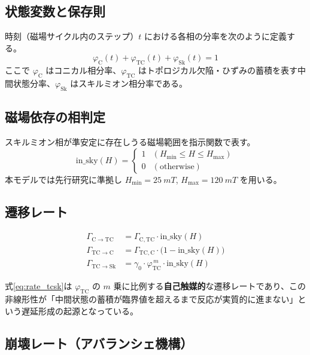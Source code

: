 \documentclass[11pt,a4paper]{ltjsarticle}
\begin{document}
\subsection{状態変数と保存則}

時刻（磁場サイクル内のステップ）$t$ における各相の分率を次のように定義する。
\begin{equation}
\varphi_\mathrm{C}(t) + \varphi_\mathrm{TC}(t) + \varphi_\mathrm{Sk}(t) = 1
\label{eq:conservation}
\end{equation}
ここで $\varphi_\mathrm{C}$ はコニカル相分率、$\varphi_\mathrm{TC}$ はトポロジカル欠陥・ひずみの蓄積を表す中間状態分率、$\varphi_\mathrm{Sk}$ はスキルミオン相分率である。

\subsection{磁場依存の相判定}

スキルミオン相が準安定に存在しうる磁場範囲を指示関数で表す。
\begin{equation}
\mathrm{in\_sky}(H) =
\begin{cases}
1 & (H_\mathrm{min} \le H \le H_\mathrm{max}) \\
0 & (\text{otherwise})
\end{cases}
\label{eq:insky}
\end{equation}
本モデルでは先行研究に準拠し $H_\mathrm{min}=\SI{25}{mT}$, $H_\mathrm{max}=\SI{120}{mT}$ を用いる。

\subsection{遷移レート}

\begin{align}
\Gamma_{\mathrm{C}\to\mathrm{TC}} &= \Gamma_{\mathrm{C,TC}} \cdot \mathrm{in\_sky}(H) \label{eq:rate_ctc}\\
\Gamma_{\mathrm{TC}\to\mathrm{C}} &= \Gamma_{\mathrm{TC,C}} \cdot \bigl(1 - \mathrm{in\_sky}(H)\bigr) \label{eq:rate_tcc}\\
\Gamma_{\mathrm{TC}\to\mathrm{Sk}} &= \gamma_0 \cdot \varphi_\mathrm{TC}^{\,m} \cdot \mathrm{in\_sky}(H) \label{eq:rate_tcsk}
\end{align}

式\eqref{eq:rate_tcsk}は $\varphi_\mathrm{TC}$ の $m$ 乗に比例する\textbf{自己触媒的}な遷移レートであり、この非線形性が「中間状態の蓄積が臨界値を超えるまで反応が実質的に進まない」という遅延形成の起源となっている。

\subsection{崩壊レート（アバランシェ機構）}
\end{document}
